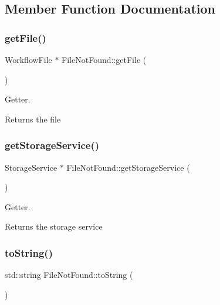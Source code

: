 \subsection{Member Function Documentation}
\mbox{\label{class_file_not_found_a8e4ccf87c3e797a454b268676ab8a5ec}} 
\subsubsection{\texorpdfstring{get\+File()}{getFile()}}
{\footnotesize\ttfamily Workflow\+File $\ast$ File\+Not\+Found\+::get\+File (\begin{DoxyParamCaption}{ }\end{DoxyParamCaption})}



Getter. 

\begin{DoxyReturn}{Returns}
the file 
\end{DoxyReturn}
\mbox{\label{class_file_not_found_abfa7b0436794b71310f46c9a31553241}} 
\subsubsection{\texorpdfstring{get\+Storage\+Service()}{getStorageService()}}
{\footnotesize\ttfamily Storage\+Service $\ast$ File\+Not\+Found\+::get\+Storage\+Service (\begin{DoxyParamCaption}{ }\end{DoxyParamCaption})}



Getter. 

\begin{DoxyReturn}{Returns}
the storage service 
\end{DoxyReturn}
\mbox{\label{class_file_not_found_ad5326f57546e7ceb3c707004d7741872}} 
\subsubsection{\texorpdfstring{to\+String()}{toString()}}
{\footnotesize\ttfamily std\+::string File\+Not\+Found\+::to\+String (\begin{DoxyParamCaption}{ }\end{DoxyParamCaption})}



